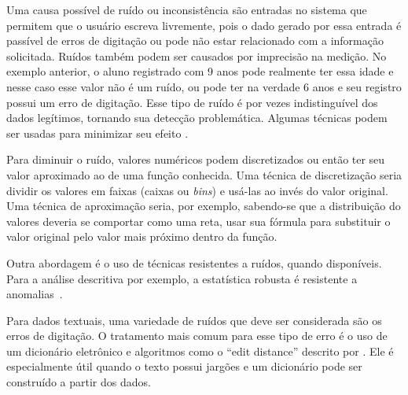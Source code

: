 \documentclass[12pt,a4paper]{article}
\begin{document}
Uma causa possível de ruído ou inconsistência são entradas no sistema que permitem que o usuário escreva livremente, pois o dado gerado por essa entrada é passível de erros de digitação ou pode não estar relacionado com a informação solicitada. Ruídos também podem ser causados por imprecisão na medição. No exemplo anterior, o aluno registrado com 9 anos pode realmente ter essa idade e nesse caso esse valor não é um ruído, ou pode ter na verdade 6 anos e seu registro possui um erro de digitação. Esse tipo de ruído é por vezes indistinguível dos dados legítimos, tornando sua detecção problemática. Algumas técnicas podem ser usadas para minimizar seu efeito \cite{Nunes2016}.

Para diminuir o ruído, valores numéricos podem discretizados ou então ter seu valor aproximado ao de uma função conhecida. Uma técnica de discretização seria dividir os valores em faixas (caixas ou \textit{bins}) e usá-las ao invés do valor original. Uma técnica de aproximação seria, por exemplo, sabendo-se que a distribuição do valores deveria se comportar como uma reta, usar sua fórmula para substituir o valor original pelo valor mais próximo dentro da função.

Outra abordagem é o uso de técnicas resistentes a ruídos, quando disponíveis. Para a análise descritiva por exemplo, a estatística robusta é resistente a anomalias~\cite{Rousseeuw2011-nk,Hellerstein2008-zr}.

Para dados textuais, uma variedade de ruídos que deve ser considerada são os erros de digitação. O tratamento mais comum para esse tipo de erro é o uso de um dicionário eletrônico e algoritmos como o \enquote{edit distance} descrito por . Ele é especialmente útil quando o texto possui jargões e um dicionário pode ser construído a partir dos dados.
\end{document}
